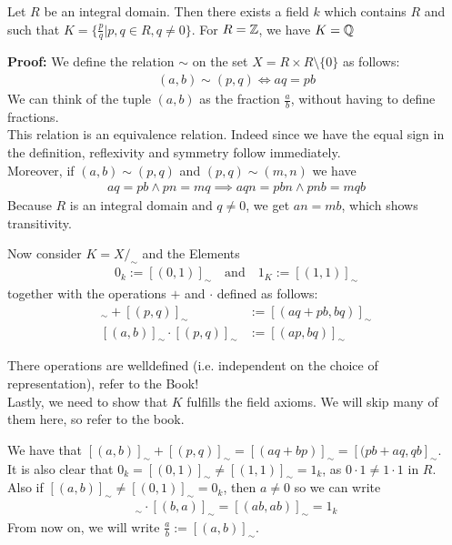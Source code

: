 \begin{theorem}
                                Let $R$ be an integral domain. Then there exists a field $k$ which contains $R$ and such that $K = \{\frac{p}{q} \big\vert p,q \in R, q \neq 0\}$. For $R = \mathbb{Z}$, we have $K = \mathbb{Q}$
\end{theorem}

\textbf{Proof:} \quad We define the relation $\sim$ on the set $X = R \times R \setminus \{0\}$ as follows:
\begin{align*}
        (a,b) \sim (p,q) \Leftrightarrow aq = pb
\end{align*}
We can think of the tuple $(a,b)$ as the fraction $\frac{a}{b}$, without having to define fractions.\\
This relation is an equivalence relation. Indeed since we have the equal sign in the definition, reflexivity and symmetry follow immediately.\\
Moreover, if $(a,b) \sim (p,q)$ and $(p,q) \sim (m,n)$ we have
\begin{align*}
aq = pb \land pn = mq \implies aqn = pbn \land pnb = mqb
\end{align*}
Because $R$ is an integral domain and $q \neq 0$, we get $an = mb$, which shows transitivity.

Now consider $K = X/_{\sim}$ and the Elements 
\begin{align*}
                                0_k := [(0,1)]_{\sim} \quad \text{and} \quad 1_K := [(1,1)]_{\sim}
\end{align*} 
together with the operations $+$ and $\cdot$ defined as follows:
\begin{align*}
                                [(a,b)]_{\sim} + [(p,q)]_{\sim} &:= [(aq + pb, bq)]_{\sim}\\
                                [(a,b)]_{\sim} \cdot [(p,q)]_{\sim} &:= [(ap,bq)]_{\sim}
\end{align*}

There operations are welldefined (i.e. independent on the choice of representation), refer to the Book!\\

Lastly, we need to show that $K$ fulfills the field axioms. We will skip many of them here, so refer to the book.

We have that $[(a,b)]_{\sim} + [(p,q)]_{\sim} = [(aq + bp)]_{\sim} = [(pb + aq,qb]_{\sim}$.\\

It is also clear that $0_k = [(0,1)]_{\sim} \neq [(1,1)]_{\sim} = 1_k$, as $0 \cdot 1 \neq 1 \cdot 1$ in $R$.\\
Also if $[(a,b)]_{\sim} \neq [(0,1)]_{\sim} = 0_k$, then $a \neq 0$ so we can write
\begin{align*}
                                [(a,b)]_{\sim} \cdot [(b,a)]_{\sim} = [(ab,ab)]_{\sim} = 1_k
\end{align*}
From now on, we will write $\frac{a}{b} := [(a,b)]_{\sim}$.\\

